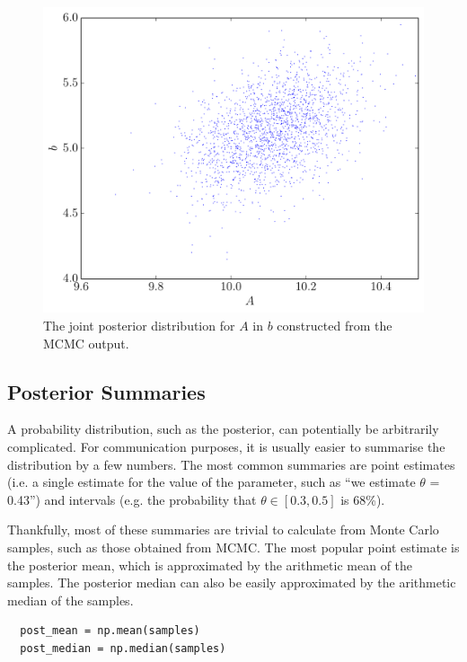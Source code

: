 \begin{figure}
\begin{center}
\includegraphics[scale=0.5]{joint_posterior.pdf}
\caption{The joint posterior distribution for $A$ in $b$ constructed from
the MCMC output.\label{fig:joint_posterior}}
\end{center}
\end{figure}


\subsection{Posterior Summaries}
A probability distribution, such as the posterior,
can potentially be arbitrarily complicated. For communication purposes, it is
usually easier to summarise the distribution by a few numbers. The most common
summaries are point estimates (i.e. a single estimate for the value of the
parameter, such as ``we estimate $\theta$ = 0.43'') and intervals (e.g.
the probability that $\theta \in [0.3, 0.5]$ is 68\%).

Thankfully, most of these summaries are trivial to calculate from Monte Carlo
samples, such as those obtained from MCMC. The most popular point estimate is
the posterior mean, which is approximated by the arithmetic mean of the samples.
The posterior median can also be easily approximated by the arithmetic median
of the samples.

\begin{verbatim}
  post_mean = np.mean(samples)
  post_median = np.median(samples)
\end{verbatim}

